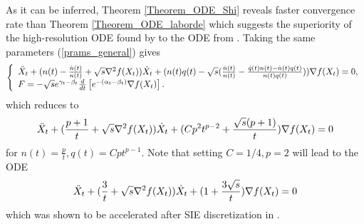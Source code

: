 \documentclass{article}
\theoremstyle{plain}
\theoremstyle{definition}
\theoremstyle{remark}
\begin{document}
As it can be inferred, Theorem \ref{Theorem_ODE_Shi} reveals faster convergence rate than Theorem \ref{Theorem_ODE_laborde} which suggests the superiority of the high-resolution ODE found by \cite{Shi2021UnderstandingTA} to the ODE from \cite{pmlr-v108-laborde20a}. Taking the same parameters (\ref{prams_general}) gives
 \begin{align}\label{HR_cnts_general_npq_SHI}
\left\{
\begin{array}{l}
     \Ddot{X}_t + (n(t)-\frac{\dot n(t)}{n(t)}+\sqrt{s}\nabla^2 f(X_t))\dot{X}_t+(n(t)q(t)-\sqrt{s} (\frac{\dot n(t)}{n(t)}-\frac{\dot q(t)n(t)-\dot n(t)q(t)}{n(t)q(t)}))\nabla f(X_t)=0,   \\
     F = -\sqrt{s}e^{\gamma_t-\beta_t}\frac{d}{dt}\left[e^{-(\alpha_t-\beta_t)}\nabla f(X_t)\right]. 
\end{array}\right.
\end{align}
which reduces to
\begin{align}\label{HR_cnts_general_npq_p}
     \Ddot{X}_t + (\frac{p+1}{t}+\sqrt{s}\nabla^2 f(X_t))\dot{X}_t+(Cp^2t^{p-2}+\frac{\sqrt{s}(p+1)}{t})\nabla f(X_t)=0
\end{align}
for $n(t)=\frac{p}{t},q(t)=Cpt^{p-1}$. Note that setting $C=1/4,p=2$ will lead to the ODE 
\begin{align}\label{HR_cnts_general_stable_ODE}
     \Ddot{X}_t + (\frac{3}{t}+\sqrt{s}\nabla^2 f(X_t))\dot{X}_t+(1+\frac{3\sqrt{s}}{t})\nabla f(X_t)=0
\end{align}
which was shown to be accelerated after SIE discretization in \cite{shi2019acceleration}.
\end{document}
